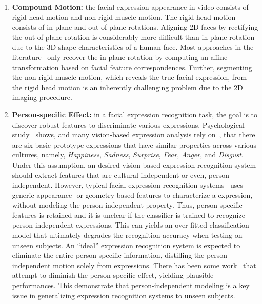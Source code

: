 \documentclass[journal]{IEEEtran}
\begin{document}
\begin{enumerate}

\item \textbf{Compound Motion:} the facial expression appearance in video consists of rigid head motion and non-rigid muscle motion. The rigid head motion consists of in-plane and out-of-plane rotations. Aligning 2D faces by rectifying the out-of-plane rotation is considerably more difficult than in-plane rotation due to the 3D shape characteristics of a human face. Most approaches in the literature~\cite{Bartlett_FG11}\cite{Valstar_FERA11} only recover the in-plane rotation by computing an affine transformation based on facial feature correspondences. Further, segmenting the non-rigid muscle motion, which reveals the true facial expression, from the rigid head motion is an inherently challenging problem due to the 2D imaging procedure.

\item \textbf{Person-specific Effect:} in a facial expression recognition task, the goal is to discover robust features to discriminate various expressions. Psychological study~\cite{Fridlund_87} shows, and many vision-based expression analysis rely on~\cite{Pantic_PAMI00}, that there are six basic prototype expressions that have similar properties across various cultures, namely, \textit{Happiness}, \textit{Sadness}, \textit{Surprise}, \textit{Fear}, \textit{Anger}, and \textit{Disgust}. Under this assumption, an desired vision-based expression recognition system should extract features that are cultural-independent or even, person-independent. However, typical facial expression recognition systems~\cite{Bartlett_FG11}\cite{Valstar_SMCB12} uses generic appearance- or geometry-based features to characterize a expression, without modeling the person-independent property. Thus, person-specific features is retained and it is unclear if the classifier is trained to recognize person-independent expressions. This can yields an over-fitted classification model that ultimately degrades the recognition accuracy when testing on unseen subjects. An ``ideal'' expression recognition system is expected to eliminate the entire person-specific information, distilling the person-independent motion solely from expressions. There has been some work~\cite{Yang_SMCB12}\cite{Dahmane_TMM14} that attempt to diminish the person-specific effect, yielding plausible performances. This demonstrate that person-independent modeling is a key issue in generalizing expression recognition systems to unseen subjects.

\end{enumerate}
\end{document}
